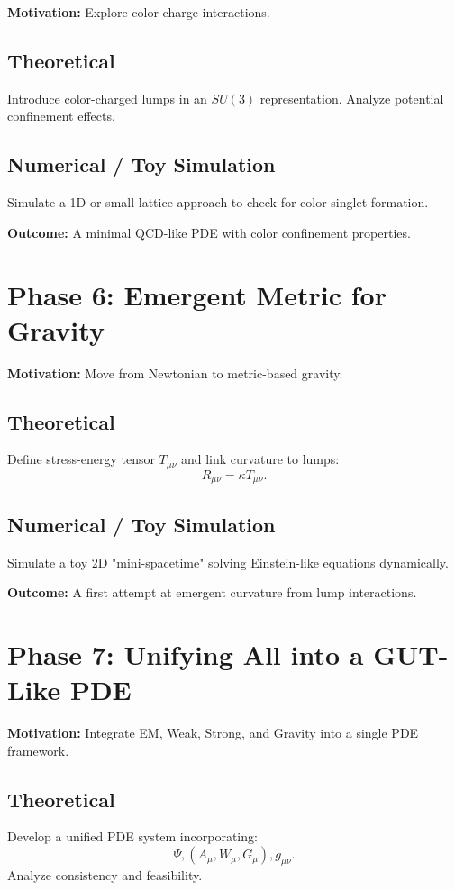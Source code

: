 \documentclass{article}
\begin{document}
\textbf{Motivation:} Explore color charge interactions.

\subsection{Theoretical}
Introduce color-charged lumps in an $SU(3)$ representation.
Analyze potential confinement effects.

\subsection{Numerical / Toy Simulation}
Simulate a 1D or small-lattice approach to check for color singlet formation.

\textbf{Outcome:} A minimal QCD-like PDE with color confinement properties.

\section{Phase 6: Emergent Metric for Gravity}

\textbf{Motivation:} Move from Newtonian to metric-based gravity.

\subsection{Theoretical}
Define stress-energy tensor $T_{\mu\nu}$ and link curvature to lumps:
\begin{equation}
    R_{\mu\nu} = \kappa T_{\mu\nu}.
\end{equation}

\subsection{Numerical / Toy Simulation}
Simulate a toy 2D "mini-spacetime" solving Einstein-like equations dynamically.

\textbf{Outcome:} A first attempt at emergent curvature from lump interactions.

\section{Phase 7: Unifying All into a GUT-Like PDE}

\textbf{Motivation:} Integrate EM, Weak, Strong, and Gravity into a single PDE framework.

\subsection{Theoretical}
Develop a unified PDE system incorporating:
\begin{equation}
    \Psi, (A_\mu, W_\mu, G_\mu), g_{\mu\nu}.
\end{equation}
Analyze consistency and feasibility.
\end{document}
